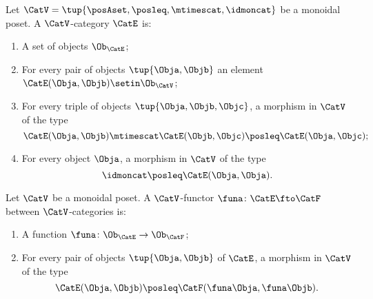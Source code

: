 \begin{ctdefinition}
    \label{def:enriched-cat-monoidal-poset}
    Let $\CatV = \tup{\posAset, \posleq, \mtimescat, \idmoncat}$ be a monoidal poset.
    A $\CatV$-category $\CatE$ is:

    \constit
    \begin{enumerate}
        \item A set of objects $\Ob_\CatE$;
        \item For every pair of objects $\tup{\Obja, \Objb}$ an element $\CatE(\Obja, \Objb) \setin \Ob_\CatV$;
        \item For every triple of objects $\tup{\Obja, \Objb, \Objc}$, a morphism in $\CatV$ of the type
              \begin{equation}
                  \CatE(\Obja, \Objb) \mtimescat \CatE(\Objb, \Objc) \posleq \CatE(\Obja, \Objc);
              \end{equation}
        \item For every object $\Obja$, a morphism in $\CatV$ of the type
              \begin{equation}
                  \idmoncat \posleq \CatE(\Obja, \Obja).
              \end{equation}
    \end{enumerate}
\end{ctdefinition}

\begin{ctdefinition}
    \label{def:functor-monoidal-poset-enriched}
    Let $\CatV$ be a monoidal poset.
    A $\CatV$-functor $\funa \colon \CatE \fto \CatF$ between $\CatV$-categories is:

    \constit
    \begin{enumerate}
        \item A function $\funa \colon \Ob_\CatE \to \Ob_\CatF$;
        \item For every pair of objects $\tup{\Obja, \Objb}$ of $\CatE$, a morphism in $\CatV$ of the type
              \begin{equation}
                  \CatE(\Obja, \Objb) \posleq \CatF(\funa \Obja, \funa \Objb).
              \end{equation}
    \end{enumerate}
\end{ctdefinition}

